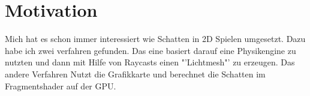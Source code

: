 \chapter{Motivation}
Mich hat es schon immer interessiert wie Schatten in 2D Spielen umgesetzt.
Dazu habe ich zwei verfahren gefunden. Das eine basiert darauf eine Physikengine zu nutzten und
dann mit Hilfe von Raycasts einen "'Lichtmesh"' zu erzeugen. Das andere Verfahren 
Nutzt die Grafikkarte und berechnet die Schatten im Fragmentshader auf der GPU.
